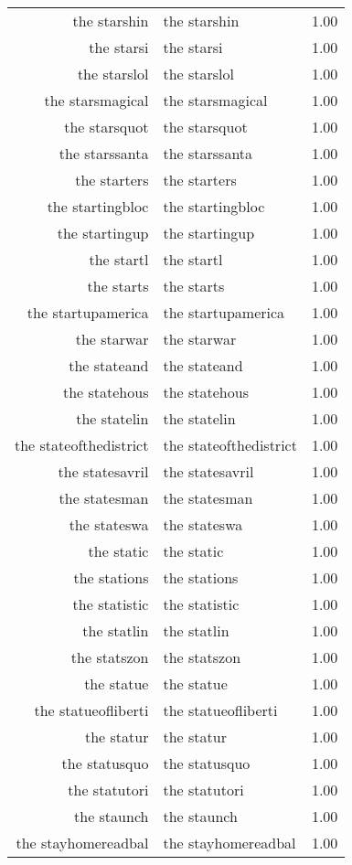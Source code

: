 \begin{table}[ht]
\begin{tabular}{rlr}
  the starshin & the starshin & 1.00 \\ 
  the starsi & the starsi & 1.00 \\ 
  the starslol & the starslol & 1.00 \\ 
  the starsmagical & the starsmagical & 1.00 \\ 
  the starsquot & the starsquot & 1.00 \\ 
  the starssanta & the starssanta & 1.00 \\ 
  the starters & the starters & 1.00 \\ 
  the startingbloc & the startingbloc & 1.00 \\ 
  the startingup & the startingup & 1.00 \\ 
  the startl & the startl & 1.00 \\ 
  the starts & the starts & 1.00 \\ 
  the startupamerica & the startupamerica & 1.00 \\ 
  the starwar & the starwar & 1.00 \\ 
  the stateand & the stateand & 1.00 \\ 
  the statehous & the statehous & 1.00 \\ 
  the statelin & the statelin & 1.00 \\ 
  the stateofthedistrict & the stateofthedistrict & 1.00 \\ 
  the statesavril & the statesavril & 1.00 \\ 
  the statesman & the statesman & 1.00 \\ 
  the stateswa & the stateswa & 1.00 \\ 
  the static & the static & 1.00 \\ 
  the stations & the stations & 1.00 \\ 
  the statistic & the statistic & 1.00 \\ 
  the statlin & the statlin & 1.00 \\ 
  the statszon & the statszon & 1.00 \\ 
  the statue & the statue & 1.00 \\ 
  the statueofliberti & the statueofliberti & 1.00 \\ 
  the statur & the statur & 1.00 \\ 
  the statusquo & the statusquo & 1.00 \\ 
  the statutori & the statutori & 1.00 \\ 
  the staunch & the staunch & 1.00 \\ 
  the stayhomereadbal & the stayhomereadbal & 1.00 \\ 

\end{tabular}
\end{table}
